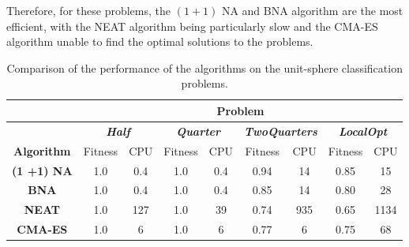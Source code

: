 Therefore, for these problems, the $(1 + 1)$ NA and BNA algorithm are the most efficient, with the NEAT algorithm being particularly slow and the CMA-ES algorithm unable to find the
optimal solutions to the problems.

\begin{table}[]
\caption{Comparison of the performance of the algorithms on the unit-sphere classification problems.}
\label{tab:comparison_sphere}
\centering
\begin{tabular}{|c|cccccccc|}
\hline
                   & \multicolumn{8}{c|}{\textbf{Problem}}                                                                                                                                                                                         \\ \hline
\textbf{}          & \multicolumn{2}{c|}{\textit{\textbf{Half}}}             & \multicolumn{2}{c|}{\textit{\textbf{Quarter}}}          & \multicolumn{2}{c|}{\textit{\textbf{TwoQuarters}}}      & \multicolumn{2}{c|}{\textit{\textbf{LocalOpt}}} \\ \hline
\textbf{Algorithm} & \multicolumn{1}{c|}{Fitness} & \multicolumn{1}{c|}{CPU} & \multicolumn{1}{c|}{Fitness} & \multicolumn{1}{c|}{CPU} & \multicolumn{1}{c|}{Fitness} & \multicolumn{1}{c|}{CPU} & \multicolumn{1}{c|}{Fitness}       & CPU        \\ \hline
\textbf{(1 +1) NA} & \multicolumn{1}{c|}{1.0}     & \multicolumn{1}{c|}{0.4} & \multicolumn{1}{c|}{1.0}     & \multicolumn{1}{c|}{0.4} & \multicolumn{1}{c|}{0.94}    & \multicolumn{1}{c|}{14}  & \multicolumn{1}{c|}{0.85}          & 15         \\ \hline
\textbf{BNA}       & \multicolumn{1}{c|}{1.0}     & \multicolumn{1}{c|}{0.4} & \multicolumn{1}{c|}{1.0}     & \multicolumn{1}{c|}{0.4} & \multicolumn{1}{c|}{0.85}    & \multicolumn{1}{c|}{14}  & \multicolumn{1}{c|}{0.80}          & 28         \\ \hline
\textbf{NEAT}      & \multicolumn{1}{c|}{1.0}     & \multicolumn{1}{c|}{127} & \multicolumn{1}{c|}{1.0}     & \multicolumn{1}{c|}{39}  & \multicolumn{1}{c|}{0.74}    & \multicolumn{1}{c|}{935} & \multicolumn{1}{c|}{0.65}          & 1134       \\ \hline
\textbf{CMA-ES}    & \multicolumn{1}{c|}{1.0}     & \multicolumn{1}{c|}{6}   & \multicolumn{1}{c|}{1.0}     & \multicolumn{1}{c|}{6}   & \multicolumn{1}{c|}{0.77}    & \multicolumn{1}{c|}{6}   & \multicolumn{1}{c|}{0.75}          & 68         \\ \hline
\end{tabular}
\end{table}

